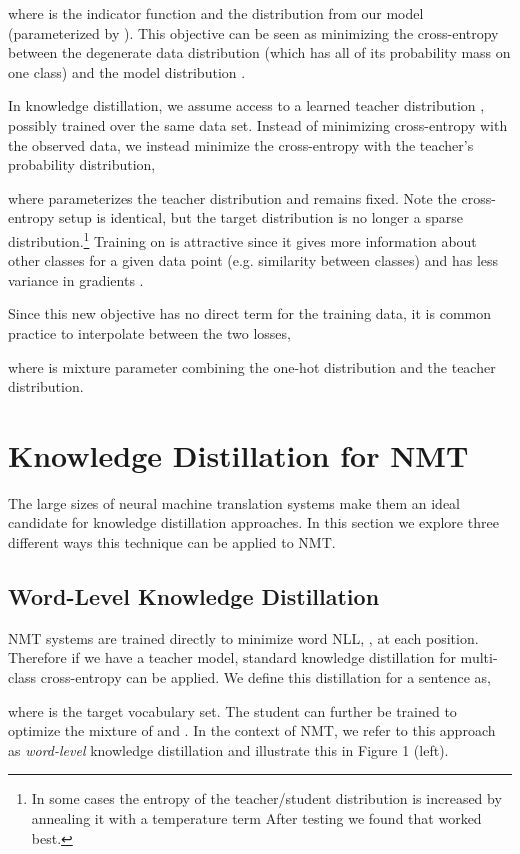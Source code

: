\documentclass[11pt,letterpaper]{article}
\begin{document}
where  is the indicator function and  the
distribution from our model (parameterized by ). This objective can be seen
as minimizing the cross-entropy between the degenerate data
distribution (which has all of its probability mass on one class) and
the model distribution .

In knowledge distillation, we assume access to a learned teacher distribution ,
possibly trained over the same data set. Instead of minimizing cross-entropy with the 
observed data, we instead minimize the cross-entropy with the teacher's probability distribution,

where  parameterizes the teacher distribution and remains fixed.
Note the cross-entropy setup is identical, but the target distribution is no longer a sparse distribution.\footnote{
In some cases the entropy of the teacher/student 
distribution is increased by annealing it with
a temperature term 
 After testing  we
found that   worked best.} Training on  is attractive
since it gives more information about other classes for a given data point (e.g.
similarity between classes) and has less variance in gradients \cite{Hinton2015}.

Since this new objective has no direct term for the training data,
it is common practice to interpolate between the two losses,

where  is mixture parameter combining the one-hot distribution and
the teacher distribution. 


\section{Knowledge Distillation for NMT} \label{seq-KD}

The large sizes of neural machine translation systems make them  an ideal candidate for 
knowledge distillation approaches. In this section we explore three different 
ways this technique can be applied to NMT.

\subsection{Word-Level Knowledge Distillation}

NMT systems are trained directly to minimize word NLL,
, at each position. Therefore 
if we have a teacher model, standard knowledge distillation 
for multi-class cross-entropy can be applied.
We define this distillation for a sentence as,

where  is the target vocabulary set. The student can further be trained to  optimize the
mixture of  and .  In
the context of NMT, we refer to this approach as \textit{word-level}
knowledge distillation and illustrate this in Figure 1 (left).
\end{document}
